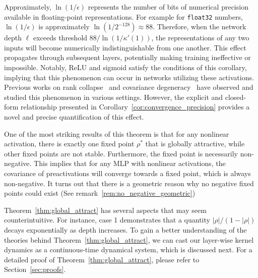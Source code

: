 \documentclass[twoside]{article}
\theoremstyle{definition}
\begin{document}
Approximately, $\ln(1/\epsilon)$ represents the number of bits of numerical precision available in floating-point representations. For example for \texttt{float32} numbers, $\ln(1/\epsilon)$ is approximately $\ln(1/2^{-128}) \approx 88$. Therefore, when the network depth $\ell$ exceeds threshold $88/\ln(1/\kappa'(1))$, the representations of any two inputs will become numerically indistinguishable from one another. This effect propagates through subsequent layers, potentially making training ineffective or impossible. Notably, ReLU and sigmoid satisfy the conditions of this corollary, implying that this phenomenon can occur in networks utilizing these activations. Previous works on rank collapse~\citep{daneshmand2020batch,noci2022signal} and covariance degeneracy~\citep{li2022neural} have observed and studied this phenomenon in various settings. However, the explicit and closed-form relationship presented in Corollary~\ref{cor:convergence_precision} provides a novel and precise quantification of this effect.

One of the most striking results of this theorem is that for any nonlinear activation, there is exactly one fixed point $\rho^*$ that is globally attractive, while other fixed points are not stable. Furthermore, the fixed point is necessarily non-negative. This implies that for any MLP with nonlinear activations, the covariance of preactivations will converge towards a fixed point, which is always non-negative. 
It turns out that there is a geometric reason why no negative fixed points could exist (See remark~\ref{rem:no_negative_geometric})


Theorem~\ref{thm:global_attract} has several aspects that may seem counterintuitive. For instance, case 1 demonstrates that a quantity $|\rho|/(1-|\rho|)$ decays exponentially as depth increases. To gain a better understanding of the theories behind Theorem~\ref{thm:global_attract}, we can cast our layer-wise kernel dynamics as a continuous-time dynamical system, which is discussed next. For a detailed proof of Theorem~\ref{thm:global_attract}, please refer to Section~\ref{sec:proofs}.
\end{document}
